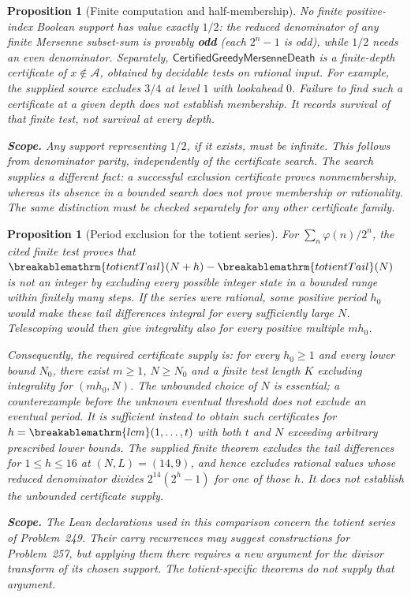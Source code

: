 \documentclass[11pt]{article}
\theoremstyle{plain}
\newtheorem{prop}[thm]{Proposition}
\theoremstyle{definition}
\theoremstyle{remark}
\renewcommand{\mathrm}[1]{\ifmmode\breakablemathrm{#1}\else\textrm{#1}\fi}%
\begin{document}
\begin{prop}[Finite computation and half-membership]
\label{prop:finite-boolSupport-and-onesided}
No finite positive-index Boolean support has value exactly $1/2$: the reduced denominator of any
finite Mersenne subset-sum is provably \textbf{odd} (each $2^n-1$ is odd), while $1/2$ needs an even
denominator. Separately,
$\mathsf{CertifiedGreedyMersenneDeath}$ is a finite-depth certificate
of $x\notin\mathcal A$, obtained by decidable tests on rational input.
For example, the supplied source excludes $3/4$ at level $1$ with
lookahead $0$.
Failure to find such a certificate at a given depth does not establish
membership.  It records survival of that finite test, not survival
at every depth.

\textbf{Scope.} Any support representing $1/2$, if it exists, must
be infinite.  This follows from denominator parity, independently
of the certificate search.  The search supplies a different fact:
a successful exclusion certificate proves nonmembership, whereas
its absence in a bounded search does not prove membership or
rationality.  The same distinction must be checked separately for
any other certificate family.
\end{prop}

\begin{prop}[Period exclusion for the totient series]
\label{prop:carry-survivor-extinction}
For $\sum_n\varphi(n)/2^n$, the cited finite test proves that
$\mathrm{totientTail}(N+h)-\mathrm{totientTail}(N)$ is not an integer
by excluding every possible integer state in a bounded range within
finitely many steps.  If the series were rational, some positive
period $h_0$ would make these tail differences integral for every
sufficiently large $N$.  Telescoping would then give integrality
also for every positive multiple $mh_0$.

Consequently, the required certificate supply is: for every $h_0\ge1$
and every lower bound $N_0$, there exist $m\ge1$, $N\ge N_0$ and a
finite test length $K$ excluding integrality for $(mh_0,N)$.  The
unbounded choice of $N$ is essential; a counterexample before the
unknown eventual threshold does not exclude an eventual period.
It is sufficient instead to obtain such certificates for
$h=\mathrm{lcm}(1,\ldots,t)$ with both $t$ and $N$ exceeding arbitrary
prescribed lower bounds.
The supplied finite theorem excludes the tail differences for
$1\le h\le16$ at $(N,L)=(14,9)$, and hence excludes rational values
whose reduced denominator divides $2^{14}(2^h-1)$ for one of those
$h$.  It does not establish the unbounded certificate supply.

\textbf{Scope.} The Lean declarations used in this comparison
concern the totient series of Problem~249.  Their carry recurrences
may suggest constructions for Problem~257, but applying them there
requires a new argument for the divisor transform of its chosen
support.  The totient-specific theorems do not supply that argument.
\end{prop}
\end{document}
